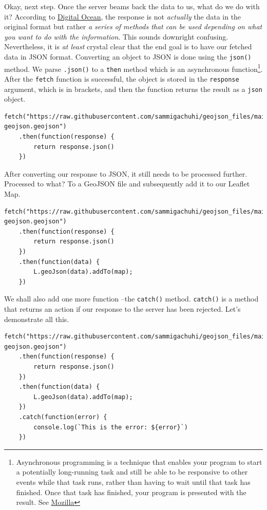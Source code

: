 \documentclass[
]{book}
\begin{document}
Okay, next step. Once the server beams back the data to us, what do we do with it? According to \href{https://www.digitalocean.com/community/tutorials/js-fetch-api}{Digital Ocean}, the response is not \emph{actually} the data in the original format but rather \emph{a series of methods that can be used depending on what you want to do with the information}. This sounds downright confusing. Nevertheless, it is \emph{at least} crystal clear that the end goal is to have our fetched data in JSON format. Converting an object to JSON is done using the \texttt{json()} method. We parse \texttt{.json()} to a \texttt{then} method which is an asynchronous function\footnote{Asynchronous programming is a technique that enables your program to start a potentially long-running task and still be able to be responsive to other events while that task runs, rather than having to wait until that task has finished. Once that task has finished, your program is presented with the result. See \href{https://developer.mozilla.org/en-US/docs/Learn/JavaScript/Asynchronous/Introducing}{Mozilla}}. After the \texttt{fetch} function is successful, the object is stored in the \texttt{response} argument, which is in brackets, and then the function returns the result as a \texttt{json} object.

\begin{verbatim}
fetch("https://raw.githubusercontent.com/sammigachuhi/geojson_files/main/cities-geojson.geojson")
    .then(function(response) {
        return response.json()
    })
\end{verbatim}

After converting our response to JSON, it still needs to be processed further. Processed to what? To a GeoJSON file and subsequently add it to our Leaflet Map.

\begin{verbatim}
fetch("https://raw.githubusercontent.com/sammigachuhi/geojson_files/main/cities-geojson.geojson")
    .then(function(response) {
        return response.json()
    })
    .then(function(data) {
        L.geoJson(data).addTo(map);
    })
\end{verbatim}

We shall also add one more function --the \texttt{catch()} method. \texttt{catch()} is a method that returns an action if our response to the server has been rejected. Let's demonstrate all this.

\begin{verbatim}
fetch("https://raw.githubusercontent.com/sammigachuhi/geojson_files/main/cities-geojson.geojson")
    .then(function(response) {
        return response.json()
    })
    .then(function(data) {
        L.geoJson(data).addTo(map);
    })
    .catch(function(error) {
        console.log(`This is the error: ${error}`)
    })
\end{verbatim}
\end{document}
